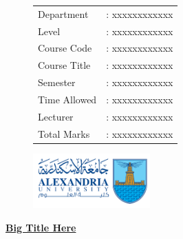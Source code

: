\documentclass[]{article}
\begin{document}
\thispagestyle{empty}
\begin{figure}
    \begin{minipage}{0.7\textwidth}
        \begin{tabular}{l l}
            Department   & : xxxxxxxxxxxx      \\
            Level        & : xxxxxxxxxxxx      \\
            Course Code  & : xxxxxxxxxxxx      \\
            Course Title & : xxxxxxxxxxxx      \\
            Semester     & : xxxxxxxxxxxx      \\
            Time Allowed & : xxxxxxxxxxxx      \\
            Lecturer     & : xxxxxxxxxxxx      \\
            Total Marks  & : xxxxxxxxxxxx      \\
        \end{tabular}
    \end{minipage}%
    \begin{minipage}{0.3\textwidth}
        \includegraphics[width=4.5cm]{collagelogo.png}
    \end{minipage}
\end{figure}
\vspace*{-1cm}
\begin{center}
    \textbf{\underline{\LARGE Big Title Here}}
\end{center}
\vspace*{.2cm}
\end{document}
